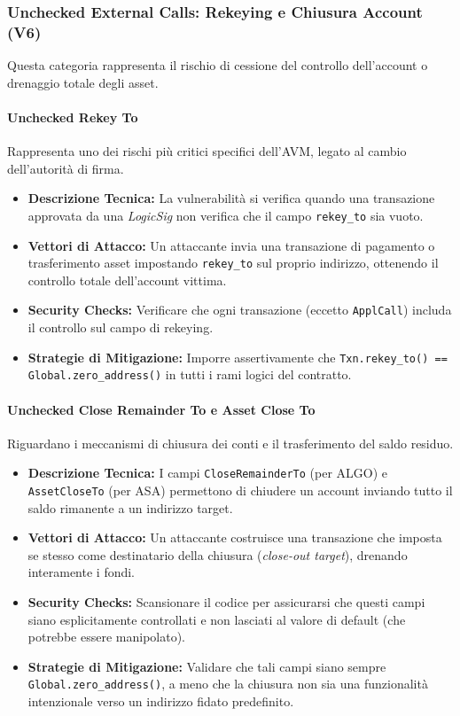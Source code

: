 \subsubsection{Unchecked External Calls: Rekeying e Chiusura Account (V6)}
Questa categoria rappresenta il rischio di cessione del controllo dell'account o drenaggio totale degli asset.

\paragraph{Unchecked Rekey To}
Rappresenta uno dei rischi più critici specifici dell'AVM, legato al cambio dell'autorità di firma.
\begin{itemize}
    \item \textbf{Descrizione Tecnica:} La vulnerabilità si verifica quando una transazione approvata da una \textit{LogicSig} non verifica che il campo \texttt{rekey\_to} sia vuoto.
    \item \textbf{Vettori di Attacco:} Un attaccante invia una transazione di pagamento o trasferimento asset impostando \texttt{rekey\_to} sul proprio indirizzo, ottenendo il controllo totale dell'account vittima.
    \item \textbf{Security Checks:} Verificare che ogni transazione (eccetto \texttt{ApplCall}) includa il controllo sul campo di rekeying.
    \item \textbf{Strategie di Mitigazione:} Imporre assertivamente che \texttt{Txn.rekey\_to() == Global.zero\_address()} in tutti i rami logici del contratto.
\end{itemize}

\paragraph{Unchecked Close Remainder To e Asset Close To}
Riguardano i meccanismi di chiusura dei conti e il trasferimento del saldo residuo.
\begin{itemize}
    \item \textbf{Descrizione Tecnica:} I campi \texttt{CloseRemainderTo} (per ALGO) e \texttt{AssetCloseTo} (per ASA) permettono di chiudere un account inviando tutto il saldo rimanente a un indirizzo target.
    \item \textbf{Vettori di Attacco:} Un attaccante costruisce una transazione che imposta se stesso come destinatario della chiusura (\textit{close-out target}), drenando interamente i fondi.
    \item \textbf{Security Checks:} Scansionare il codice per assicurarsi che questi campi siano esplicitamente controllati e non lasciati al valore di default (che potrebbe essere manipolato).
    \item \textbf{Strategie di Mitigazione:} Validare che tali campi siano sempre \texttt{Global.zero\_address()}, a meno che la chiusura non sia una funzionalità intenzionale verso un indirizzo fidato predefinito.
\end{itemize}

